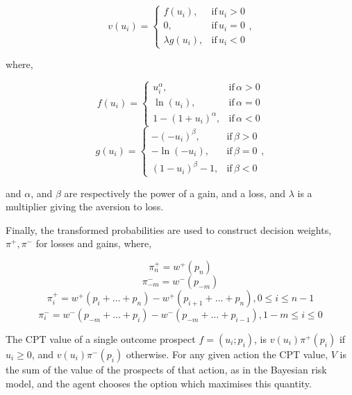 \begin{equation}
v(u_{i})=\begin{cases}
f(u_{i}),& \text{if}\, u_{i}>0\\
0,& \text{if}\, u_{i}=0\\
\lambda g(u_{i}),& \text{if}\, u_{i}<0
\end{cases},
\end{equation}


where,

\begin{equation}
f(u_{i})=\begin{cases}
u_{i}^{\alpha},& \text{if}\,\alpha>0\\
\ln(u_{i}),& \text{if}\,\alpha=0\\
1-(1+u_{i})^{\alpha},& \text{if}\,\alpha<0
\end{cases}
\end{equation}
\begin{equation}
g(u_{i})=\begin{cases}
-(-u_{i})^{\beta},& \text{if}\,\beta>0\\
-\ln(-u_{i}),& \text{if}\,\beta=0\\
(1-u_{i})^{\beta}-1,& \text{if}\,\beta<0
\end{cases},
\end{equation}


and $\alpha$, and $\beta$ are respectively the power of a gain,
and a loss, and \(\lambda\) is a multiplier giving the aversion to loss.

Finally, the transformed probabilities are used to construct decision weights, \(\pi^{+},\pi^{-}\) for losses and gains, where,

\begin{equation}
\pi_{n}^{+}=w^{+}(p_{n})
\end{equation}
\begin{equation}
\pi_{-m}^{-}=w^{-}(p_{-m})
\end{equation}
\begin{equation}
\pi_{i}^{+}=w^{+}(p_{i}+\ldots+p_{n}) - w^{+}(p_{i+1}+\ldots+p_{n}),0\leq i \leq n - 1
\end{equation}
\begin{equation}
\pi_{i}^{-}=w^{-}(p_{-m}+\ldots+p_{i}) - w^{-}(p_{-m}+\ldots+p_{i-1}),1-m\leq i \leq 0
\end{equation}

The \ac{CPT} value of a single outcome prospect \(f=(u_{i};p_{i})\), is $v(u_{i})\pi^{+}(p_{i})$
if $u_{i}\geq0$, and $v(u_{i})\pi^{-}(p_{i})$ otherwise. For any given action the \ac{CPT}
value, \(V\) is the sum of the value of the prospects of that action, as
in the Bayesian risk model, and the agent chooses the option which maximises this quantity.